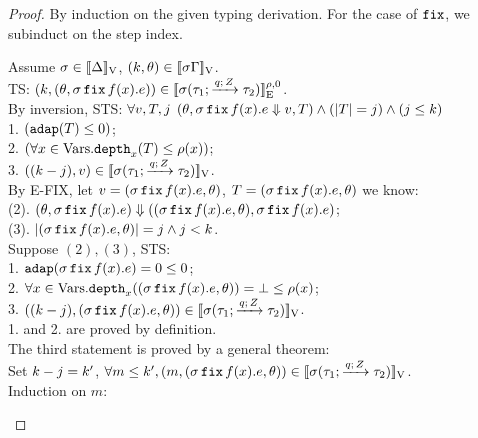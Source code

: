 \begin{proof}
By induction on the given typing derivation. For the case of
$\efix$, we subinduct on the step index.\\
\begin{mainitem} 


Assume $ \ienv \in \lrv{\Delta}$, $(\stepiA, \env) \in \lrv{\ienv \Gamma}$.\\
%
TS: $(\stepiA, (\env, \ienv \efix f(x). \expr)) \in \lre{\dmap}{
  0}{\ienv (\tarr{\type_1}{\type_2}{ }{\nnatbiA }{\nnatA}) }$.\\
%
By inversion, 
STS: $\forall \valr, \tr, j$ 
$(\env, \ienv \efix f(x). \expr \bigstep \valr, \tr) \land (\size{\tr} = j) \land (j \leq \stepiA)$\\
%
1. $(\adap(\tr) \leq 0 ) $;\\
%
2. $ (\forall x \in \mbox{Vars}. \ddep{x}(\tr) \leq \dmap(x)) $;\\
%
3. $ ((\stepiA - j), \valr) \in \lrv{\ienv (\tarr{\type_1}{\type_2}{ }{\nnatbiA }{\nnatA})}$.\\
%
By E-FIX, let $\valr = (\ienv \efix f(x). \expr, \env)$, $\tr =  (\ienv \efix f(x). \expr, \env)$ we know:\\
%
(2). $(\env, \ienv \efix f(x). \expr) \bigstep ((\ienv \efix f(x). \expr, \env), \ienv \efix f(x). \expr) $;\\
%
(3). $| (\ienv \efix f(x). \expr, \env)|= j \land j < \stepiA$.\\
%
Suppose $(2), (3)$, STS:\\
%
1. $ \adap(\ienv \efix f(x). \expr) = 0 \leq 0$;\\
%
2. $ \forall x \in \mbox{Vars}. \ddep{x}( (\ienv \efix f(x). \expr,
\env) ) = \bot \leq \dmap(x) $;\\
%
3. $((\stepiA -j), (\ienv \efix f(x). \expr, \env)) \in \lrv{ \ienv (\tarr{\type_1}{\type_2}{ }{\nnatbiA }{\nnatA}) }$.\\
%
1. and 2. are proved by definition.\\
The third statement is proved by a general theorem: \\
%
Set $\stepiA - j = \stepiA'$, $\forall m \leq \stepiA', (m, (\ienv \efix f(x). \expr, \env)) \in \lrv{\ienv (\tarr{\type_1}{\type_2}{ }{\nnatbiA }{\nnatA})}$.\\
%
Induction on $m$:


\end{mainitem}
\end{proof}
